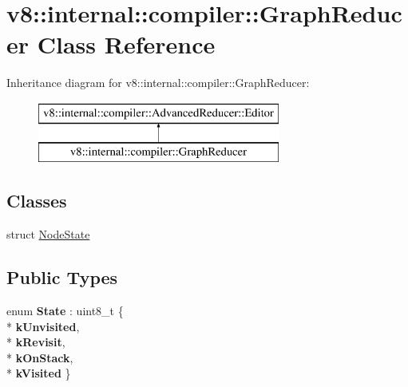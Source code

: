 \hypertarget{classv8_1_1internal_1_1compiler_1_1_graph_reducer}{}\section{v8\+:\+:internal\+:\+:compiler\+:\+:Graph\+Reducer Class Reference}
\label{classv8_1_1internal_1_1compiler_1_1_graph_reducer}
Inheritance diagram for v8\+:\+:internal\+:\+:compiler\+:\+:Graph\+Reducer\+:\begin{figure}[H]
\begin{center}
\leavevmode
\includegraphics[height=2.000000cm]{classv8_1_1internal_1_1compiler_1_1_graph_reducer}
\end{center}
\end{figure}
\subsection*{Classes}
\begin{DoxyCompactItemize}
\item 
struct \hyperlink{structv8_1_1internal_1_1compiler_1_1_graph_reducer_1_1_node_state}{Node\+State}
\end{DoxyCompactItemize}
\subsection*{Public Types}
\begin{DoxyCompactItemize}
\item 
enum {\bfseries State} \+: uint8\+\_\+t \{ \\*
{\bfseries k\+Unvisited}, 
\\*
{\bfseries k\+Revisit}, 
\\*
{\bfseries k\+On\+Stack}, 
\\*
{\bfseries k\+Visited}
 \}\hypertarget{classv8_1_1internal_1_1compiler_1_1_graph_reducer_a78f7183b04d38293dfde6d60ceaa3d3e}{}\label{classv8_1_1internal_1_1compiler_1_1_graph_reducer_a78f7183b04d38293dfde6d60ceaa3d3e}

\end{DoxyCompactItemize}

